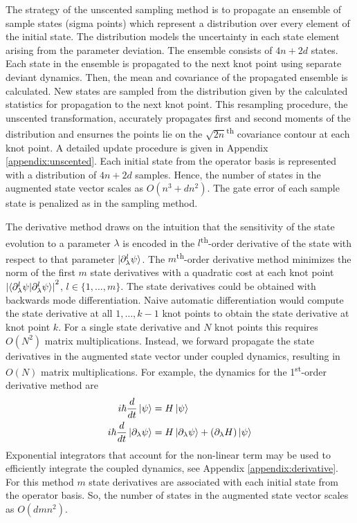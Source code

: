 The strategy of the unscented sampling method is to
propagate an ensemble of sample states (sigma points) which represent a distribution
over every element of the initial state. The distribution
models the uncertainty in each state element arising from the
parameter deviation. The ensemble consists of $4n + 2d$ states.
Each state in the
ensemble is propagated to the next
knot point using separate deviant dynamics. Then, the mean and covariance of
the propagated ensemble is calculated. New states are sampled from the distribution
given by the calculated statistics for propagation to the next knot point.
This resampling procedure, the unscented transformation, accurately propagates
first and second moments of the distribution and ensurnes the points
lie on the $\sqrt{2n}$\textsuperscript{th}
covariance contour at each knot point. A detailed update procedure is given
in Appendix \ref{appendix:unscented}. Each initial state from the operator basis
is represented with a distribution of $4n + 2d$ samples. Hence,
the number of states in the augmented state vector scales as $O(n^{3} + dn^{2})$.
The gate error of each sample state is penalized as in the sampling method.

The derivative method draws on the intuition that
the sensitivity of the state evolution to a parameter
$\lambda$ is encoded in the $l$\textsuperscript{th}-order
derivative of the state with respect to that parameter
$\ket{\partial_{\lambda}^{l} \psi}$. The $m$\textsuperscript{th}-order
derivative method minimizes the norm of the first $m$
state derivatives with a quadratic cost at each knot point
${\lvert \braket{\partial^{l}_{\lambda} \psi | \partial^{l}_{\lambda} \psi}
  \rvert}^{2}$, $l \in \{1, \dots, m\}$.
The state derivatives could be obtained with backwards mode differentiation.
Naive automatic differentiation would compute
the state derivative at all $1, \dots, k - 1$ knot points
to obtain the state derivative at knot point $k$.
For a single state derivative and $N$ knot points this
requires $O(N^2)$ matrix multiplications.
Instead, we forward propagate the state derivatives in the
augmented state vector under coupled dynamics, resulting in
$O(N)$ matrix multiplications. For example, the dynamics
for the 1\textsuperscript{st}-order derivative method are
\begin{align}
  i \hbar \frac{d}{dt} \ket{\psi} &= H \ket{\psi}\\
  i \hbar \frac{d}{dt} \ket{\partial_{\lambda}\psi} &=
  H \ket{\partial_{\lambda} \psi} +
  (\partial_{\lambda} H) \ket{\psi}
\end{align}
Exponential integrators that account for the non-linear
term may be used to efficiently integrate the coupled dynamics,
see Appendix \ref{appendix:derivative}.
For this method $m$ state derivatives are associated with each
initial state from the operator basis.
So, the number of states in the augmented state vector scales as
$O(dmn^{2})$.

